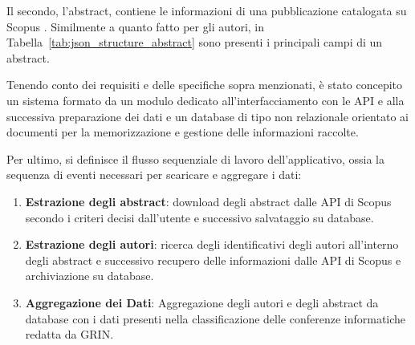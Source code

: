 Il secondo, l'abstract, contiene le informazioni di una pubblicazione catalogata su Scopus \cite{abstract-scopus}. Similmente a quanto fatto per gli autori, in Tabella~\ref{tab:json_structure_abstract} sono presenti i principali campi di un abstract.

Tenendo conto dei requisiti e delle specifiche sopra menzionati, è stato concepito un sistema formato da un modulo dedicato all'interfacciamento con le API e alla successiva preparazione dei dati e un database di tipo non relazionale orientato ai documenti per la memorizzazione e gestione delle informazioni raccolte.

Per ultimo, si definisce il flusso sequenziale di lavoro dell'applicativo, ossia la sequenza di eventi necessari per scaricare e aggregare i dati:
\begin{enumerate}
    \item \textbf{Estrazione degli abstract}: download degli abstract dalle API di Scopus secondo i criteri decisi dall'utente e successivo salvataggio su database.
    \item \textbf{Estrazione degli autori}: ricerca degli identificativi degli autori all'interno degli abstract e successivo recupero delle informazioni dalle API di Scopus e archiviazione su database.
    \item \textbf{Aggregazione dei Dati}: Aggregazione degli autori e degli abstract da database con i dati presenti nella classificazione delle conferenze informatiche redatta da GRIN.
\end{enumerate}

